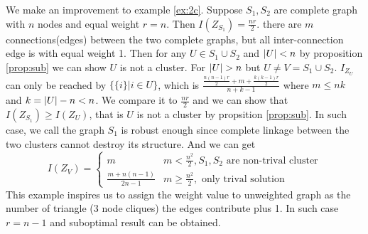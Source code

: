 \documentclass{article}
\begin{document}
\begin{example}
We make an improvement to example \ref{ex:2c}.
Suppose $S_1, S_2 $ are complete graph with $n$ nodes and equal weight $r=n$. Then $I(Z_{S_1})= \frac{nr}{2}$. there are $m$ connections(edges) between the two complete graphs, but all inter-connection edge is with equal weight 1. Then for any $U \in S_1 \cup S_2 $ and $\lvert U\rvert < n$ by proposition \ref{prop:sub} we can show $U$ is not a cluster.
For $\lvert U\rvert > n$ but $U \neq V = S_1 \cup S_2$. $I_{Z_U}$ can only be reached by $\{\{i\}| i\in U\}$, which is $\frac{\frac{n(n-1)r}{2} + m + \frac{k(k-1)r}{2}}{n+k-1}$ where $m \leq nk$ and $k=\lvert U\rvert - n < n$. We compare it to $\frac{nr}{2}$ and we can show that $I(Z_{S_1}) \geq I(Z_U) $, that is $U$ is not a cluster by propsition \ref{prop:sub}. 
In such case, we call the graph $S_1$ is robust enough since complete linkage between the two clusters cannot destroy its structure. And we can get
\begin{equation*}
I(Z_V) = \begin{cases}
m & m <\frac{n^2}{2}, S_1,S_2 \textrm{ are non-trival cluster} \\
\frac{m+n(n-1)}{2n-1} & m\geq \frac{n^2}{2}, \textrm{ only trival solution} 
\end{cases}
\end{equation*}
This example inspires us to assign the weight value to unweighted graph as the number of triangle (3 node cliques) the edges contribute plus 1. In such case $ r = n-1$ and suboptimal result can be obtained. 
\end{example}
\end{document}
